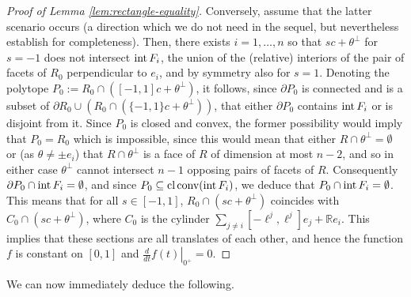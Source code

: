 \documentclass[11pt]{article}
\theoremstyle{definition}
\theoremstyle{proof}
\newcommand{\dt}[1]{\left . \frac{d}{dt} #1 \right |_{0^+}}
\DeclareMathOperator{\+}{\mathop{\tilde{+}}}
\DeclareMathOperator{\interior}{\textnormal{int}}
\DeclareMathOperator{\closure}{\textnormal{cl}}
\DeclareMathOperator{\conv}{\textnormal{conv}}
\newcommand{\R}{\mathbb{R}}
\newcommand{\h}{\ell}
\numberwithin{equation}{section}
\numberwithin{equation}{section}
\begin{document}
\begin{proof}[Proof of Lemma \ref{lem:rectangle-equality}]
Conversely, assume that the latter scenario occurs  (a direction which we do not need in the sequel, but nevertheless establish for completeness). Then, there exists $i=1,\ldots,n$ so that $s c + \theta^{\perp}$ for $s=-1$ does not intersect $\interior F_i$, the union of the (relative) interiors of the pair of facets of $R_0$ perpendicular to $e_i$, and by symmetry also for $s=1$. Denoting the polytope $P_0 := R_0 \cap ([-1,1] c + \theta^{\perp})$, it follows, since $\partial P_0$ is connected and is a subset of $\partial R_0 \cup (R_0 \cap (\{-1,1\} c + \theta^{\perp}))$, that either $\partial P_0$ contains $\interior F_i$ or is disjoint from it. Since $P_0$ is closed and convex, the former possibility would imply that $P_0 = R_0$ which is impossible, since this would mean that either $R \cap \theta^{\perp} = \emptyset$ or (as $\theta \neq \pm e_i$) that $R \cap \theta^{\perp}$ is a face of $R$ of dimension at most $n-2$, and so in either case $\theta^{\perp}$ cannot intersect $n-1$ opposing pairs of facets of $R$. Consequently $\partial P_0 \cap \interior F_i = \emptyset$, and since $P_0 \subseteq \closure \conv(\interior F_i)$, we deduce that $P_0 \cap \interior F_i = \emptyset$. This means that for all $s \in [-1,1]$, $R_0 \cap (s c + \theta^{\perp})$ coincides with $C_0 \cap (s c + \theta^{\perp})$, where $C_0$ is the cylinder $\sum_{j \neq i} [-\h^j,\h^j] e_j + \R e_i$. This implies that these sections are all translates of each other, and hence the function $f$ is constant on $[0,1]$ and $\dt{f(t)} =0$. 
  \end{proof}

We can now immediately deduce the following. 
\end{document}
